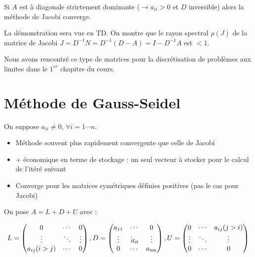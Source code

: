 \begin{ftheo}
    Si $A$ est à diagonale strictement dominante ($\rightarrow a_{ii}>0$ et $D$ inversible) alors la méthode de Jacobi converge.
\end{ftheo}

La démonstration sera vue en TD. On montre que le rayon spectral $\rho(J)$ de la matrice de Jacobi $J = D^{-1}N = D^{-1}(D-A) = I - D^{-1}A$ est $< 1$.

Nous avons rencontré ce type de matrices pour la discrétisation de problèmes aux limites dans le $1^{er}$ chapitre du cours.

\section{Méthode de Gauss-Seidel}

On suppose $a_{ii} \ne 0$, $\forall i = 1 \cdots n$.
\begin{itemize}
\item Méthode souvent plus rapidement convergente que celle de Jacobi
\item + économique en terme de stockage : un seul vecteur à stocker pour le calcul de l'itéré suivant
\item Converge pour les matrices symétriques définies positives (pas le cas pour Jacobi)
\end{itemize}

On pose $A = L + D + U$ avec :

\[
   L =
   \begin{pmatrix}
        0        & \cdots & 0      \\
        \vdots   & \ddots & \vdots \\
        a_{ij}(i>j)      & \cdots & 0
   \end{pmatrix}
   , D =
   \begin{pmatrix}
       a_{11} & \cdots                      & 0      \\ 
       \vdots & a_{ii}\hspace{-0.5cm}\ddots & \vdots \\ 
       0      & \cdots                      & a_{nn}
   \end{pmatrix}
   , U =
   \begin{pmatrix}
        0        & \cdots & a_{ij}(j>i)     \\
        \vdots   & \ddots & \vdots \\
        0        & \cdots & 0
   \end{pmatrix}
\]

